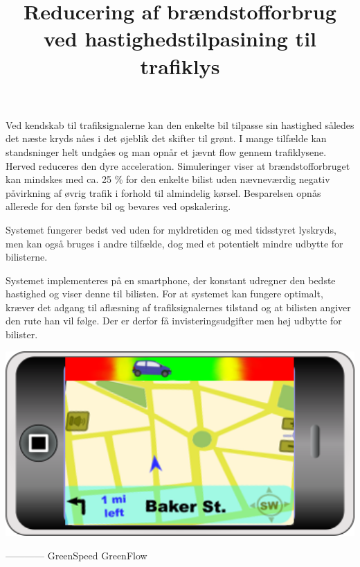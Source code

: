 \documentclass{article}
\title{Reducering af brændstofforbrug ved hastighedstilpasining til trafiklys}
\date{}
\begin{document}
\maketitle

Ved kendskab til trafiksignalerne kan den enkelte bil tilpasse sin hastighed således det næste kryds nåes i det øjeblik det skifter til grønt.
I mange tilfælde kan standsninger helt undgåes og man opnår et jævnt flow gennem trafiklysene.
Herved reduceres den dyre acceleration.
Simuleringer viser at brændstofforbruget kan mindskes med ca. 25 \% for den enkelte bilist uden nævneværdig negativ påvirkning af øvrig trafik i forhold til almindelig kørsel.
Besparelsen opnås allerede for den første bil og bevares ved opskalering.

Systemet fungerer bedst ved uden for myldretiden og med tidsstyret lyskryds, men kan også bruges i andre tilfælde, dog med et potentielt mindre udbytte for bilisterne.

Systemet implementeres på en smartphone, der konstant udregner den bedste hastighed og viser denne til bilisten. 
For at systemet kan fungere optimalt, kræver det adgang til aflæsning af trafiksignalernes tilstand og at bilisten angiver den rute han vil følge.
Der er derfor få invisteringsudgifter men høj udbytte for bilister.

\includegraphics[width=1\textwidth]{images/product.png}

------------
GreenSpeed
GreenFlow
\end{document}
